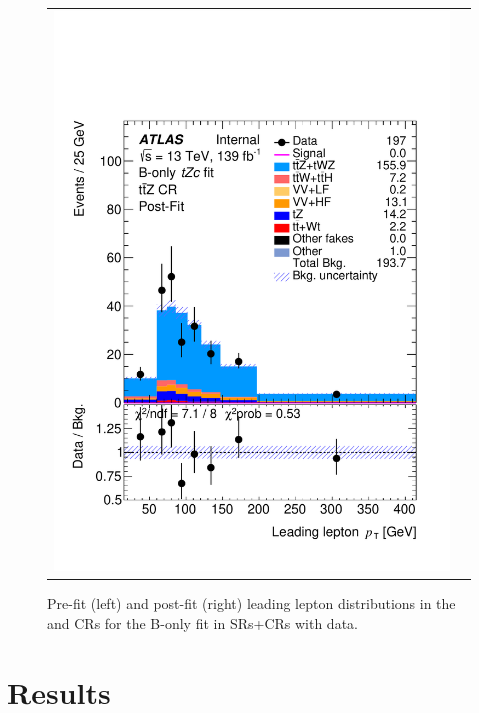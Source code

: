 \begin{figure}[htbp]
\begin{tabular}{cc}
		\includegraphics[width=.45\textwidth]{Chapters/CH8/figures/BONLY_CRSR_DL1rc_unblind/Plots/TTZCR_postFit} \\
	\end{tabular}
	\caption{Pre-fit (left) and post-fit (right) leading lepton \pt distributions in the \ttbar and \ttZ CRs for the B-only \tZc fit in SRs+CRs with data.
		\ErrStatSys
	}%
	\label{fig:stat:tzc:splusb:crsr:crplots:2_unb}
\end{figure}

\clearpage
\section{Results}
\label{sec:stat:tzc}
